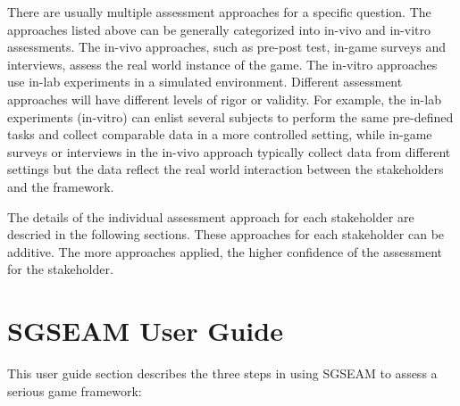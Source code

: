 \documentclass[11pt]{article}
\begin{document}
There are usually multiple assessment approaches for a specific question. The approaches listed above can be generally categorized into in-vivo and in-vitro assessments. The in-vivo approaches, such as pre-post test, in-game surveys and interviews, assess the real world instance of the game. The in-vitro approaches use in-lab experiments in a simulated environment. Different assessment
approaches will have different levels of rigor or validity. For example, the in-lab experiments (in-vitro) can enlist several subjects to perform the same pre-defined tasks and collect comparable data in a more controlled setting, while in-game surveys or interviews in the in-vivo approach typically collect data from different settings but the data reflect the real world interaction between the stakeholders and the framework.

The details of the individual assessment approach for each stakeholder are descried in the following sections. These approaches for each stakeholder can be additive. The more approaches applied, the higher confidence of the assessment for the stakeholder.

\section{SGSEAM User Guide}

This user guide section describes the three steps in using SGSEAM to assess a serious game framework:
\end{document}
